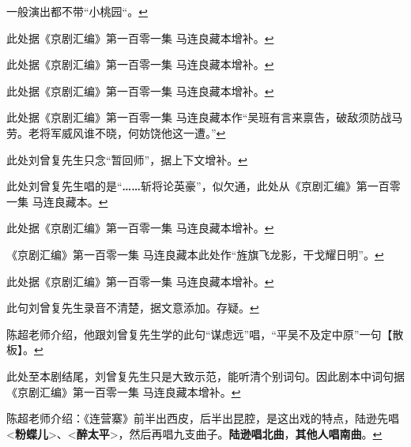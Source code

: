   一般演出都不带``小桃园``。\protect\hyperlink{fnref200}{↩}
\item
  \leavevmode\hypertarget{fn201}{}%
  此处据《京剧汇编》第一百零一集
  马连良藏本增补。\protect\hyperlink{fnref201}{↩}
\item
  \leavevmode\hypertarget{fn202}{}%
  此处据《京剧汇编》第一百零一集
  马连良藏本增补。\protect\hyperlink{fnref202}{↩}
\item
  \leavevmode\hypertarget{fn203}{}%
  此处据《京剧汇编》第一百零一集
  马连良藏本增补。\protect\hyperlink{fnref203}{↩}
\item
  \leavevmode\hypertarget{fn204}{}%
  此处据《京剧汇编》第一百零一集
  马连良藏本作``吴班有言来禀告，破敌须防战马劳。老将军威风谁不晓，何妨饶他这一遭。''\protect\hyperlink{fnref204}{↩}
\item
  \leavevmode\hypertarget{fn205}{}%
  此处刘曾复先生只念``暂回师''，据上下文增补。\protect\hyperlink{fnref205}{↩}
\item
  \leavevmode\hypertarget{fn206}{}%
  此处刘曾复先生唱的是``\textbf{\ldots{}\ldots{}}斩将论英豪''，似欠通，此处从《京剧汇编》第一百零一集
  马连良藏本。\protect\hyperlink{fnref206}{↩}
\item
  \leavevmode\hypertarget{fn207}{}%
  此处据《京剧汇编》第一百零一集
  马连良藏本增补。\protect\hyperlink{fnref207}{↩}
\item
  \leavevmode\hypertarget{fn208}{}%
  《京剧汇编》第一百零一集
  马连良藏本此处作``旌旗飞龙影，干戈耀日明''。\protect\hyperlink{fnref208}{↩}
\item
  \leavevmode\hypertarget{fn209}{}%
  此处据《京剧汇编》第一百零一集
  马连良藏本增补。\protect\hyperlink{fnref209}{↩}
\item
  \leavevmode\hypertarget{fn210}{}%
  此句刘曾复先生录音不清楚，据文意添加。存疑。\protect\hyperlink{fnref210}{↩}
\item
  \leavevmode\hypertarget{fn211}{}%
  陈超老师介绍，他跟刘曾复先生学的此句``谋虑远''唱，``平吴不及定中原''一句【散板】。\protect\hyperlink{fnref211}{↩}
\item
  \leavevmode\hypertarget{fn212}{}%
  此处至本剧结尾，刘曾复先生只是大致示范，能听清个别词句。因此剧本中词句据《京剧汇编》第一百零一集
  马连良藏本增补。\protect\hyperlink{fnref212}{↩}
\item
  \leavevmode\hypertarget{fn213}{}%
  陈超老师介绍：《连营寨》前半出西皮，后半出昆腔，是这出戏的特点，陆逊先唱\textless{}\textbf{粉蝶儿}\textgreater{}、\textless{}\textbf{醉太平}\textgreater{}，然后再唱九支曲子。\textbf{陆逊唱北曲}，\textbf{其他人唱南曲}。\protect\hyperlink{fnref213}{↩}
